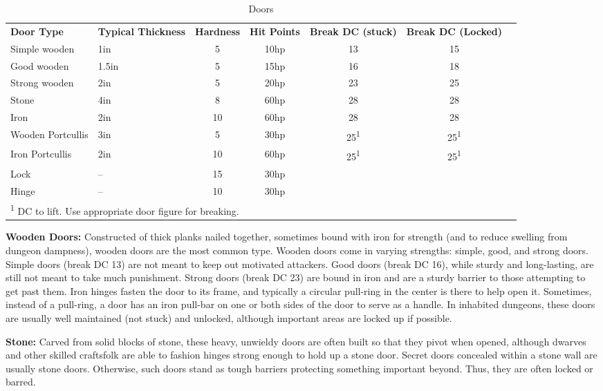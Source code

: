 \begin{table}[htb]
\caption{Doors}
\centering
\begin{tabular}{l l c c c c c}
\textbf{Door Type} & \textbf{Typical Thickness} & \textbf{Hardness} & \textbf{Hit Points} & \textbf{Break DC (stuck)} & \textbf{Break DC (Locked)}\\
Simple wooden & 1in & 5 & 10hp & 13 & 15\\
Good wooden & 1.5in & 5 & 15hp & 16 & 18\\
Strong wooden & 2in & 5 & 20hp & 23 & 25\\
Stone & 4in & 8 & 60hp & 28 & 28\\
Iron & 2in & 10 & 60hp & 28 & 28\\
Wooden Portcullis & 3in & 5 & 30hp & 25\textsuperscript{1} & 25\textsuperscript{1}\\
Iron Portcullis & 2in & 10 & 60hp & 25\textsuperscript{1} & 25\textsuperscript{1}\\
Lock & -- & 15 & 30hp & & \\
Hinge & -- & 10 & 30hp & & \\
\multicolumn{6}{l}{\textsuperscript{1} DC to lift. Use appropriate door figure for breaking.}\\
\end{tabular}
\end{table}

\textbf{Wooden Doors:} Constructed of thick planks nailed together, sometimes bound 
with iron for strength (and to reduce swelling from dungeon dampness), wooden doors 
are the most common type. Wooden doors come in varying strengths: simple, good, 
and strong doors. Simple doors (break DC 13) are not meant to keep out motivated 
attackers. Good doors (break DC 16), while sturdy and long-lasting, are still not 
meant to take much punishment. Strong doors (break DC 23) are bound in iron and 
are a sturdy barrier to those attempting to get past them. Iron hinges fasten the 
door to its frame, and typically a circular pull-ring in the center is there to 
help open it. Sometimes, instead of a pull-ring, a door has an iron pull-bar on 
one or both sides of the door to serve as a handle. In inhabited dungeons, these 
doors are usually well maintained (not stuck) and unlocked, although important 
areas are locked up if possible.

\textbf{Stone:} Carved from solid blocks of stone, these heavy, unwieldy doors 
are often built so that they pivot when opened, although dwarves and other skilled 
craftsfolk are able to fashion hinges strong enough to hold up a stone door. Secret 
doors concealed within a stone wall are usually stone doors. Otherwise, such doors 
stand as tough barriers protecting something important beyond. Thus, they are often 
locked or barred.

